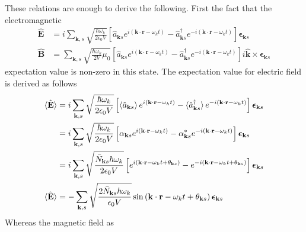 \documentclass[../../../main.tex]{subfiles}
\begin{document}
These relations are enough to derive the following.
First the fact that the electromagnetic
\begin{align*}
  \hat{\mathbf{E}} & =  i \sum_{\mathbf{k},s} \sqrt{\frac{\hbar \omega_k}{2 \epsilon_0 V}} \left[ \hat{a}_{\mathbf{k}s} e^{i(\mathbf{k} \cdot \mathbf{r} - \omega_k t)} - \hat{a}_{\mathbf{k}s}^{\dagger} e^{-i(\mathbf{k} \cdot \mathbf{r} - \omega_k t)} \right] \boldsymbol{\epsilon}_{\mathbf{k}s}                    \\
  \hat{\mathbf{B}} & =  \sum_{\mathbf{k},s} \sqrt{\frac{\hbar \omega_k}{2 V} \mu_0} \left[ \hat{a}_{\mathbf{k}s} e^{i(\mathbf{k} \cdot \mathbf{r} - \omega_k t)} - \hat{a}_{\mathbf{k}s}^{\dagger} e^{-i(\mathbf{k} \cdot \mathbf{r} - \omega_k t)} \right] i \mathbf{\hat{k}} \times \boldsymbol{\epsilon}_{\mathbf{k}s}
\end{align*}
expectation value is non-zero in this state.
The expectation value for electric field is derived as follows
\begin{align*}
  \braket{  \hat{\mathbf{E}}  }
   & =  i \sum_{\mathbf{k},s} \sqrt{\frac{\hbar \omega_k}{2 \epsilon_0 V}} \left[ \braket{\hat{a}_{\mathbf{k}s}  } e^{i(\mathbf{k} \cdot \mathbf{r} - \omega_k t)} - \braket{\hat{a}_{\mathbf{k}s}^{\dagger}} e^{-i(\mathbf{k} \cdot \mathbf{r} - \omega_k t)} \right] \boldsymbol{\epsilon}_{\mathbf{k}s} \\
   & =  i \sum_{\mathbf{k},s} \sqrt{\frac{\hbar \omega_k}{2 \epsilon_0 V}} \left[ \alpha_{\mathbf{k }s} e^{i(\mathbf{k} \cdot \mathbf{r} - \omega_k t)} - \alpha_{\mathbf{k }s}^* e^{-i(\mathbf{k} \cdot \mathbf{r} - \omega_k t)} \right] \boldsymbol{\epsilon}_{\mathbf{k}s}                             \\
   & =  i \sum_{\mathbf{k},s} \sqrt{\frac{\bar{N}_{\mathbf{k}s}\hbar \omega_k }{2 \epsilon_0 V}} \left[  e^{i(\mathbf{k} \cdot \mathbf{r} - \omega_k t+ \theta_{\mathbf{k}s})} - e^{-i(\mathbf{k} \cdot \mathbf{r} - \omega_k t+\theta_{\mathbf{k}s}) } \right] \boldsymbol{\epsilon}_{\mathbf{k}s}        \\
  \braket{  \hat{\mathbf{E}}  }
   & =  - \sum_{\mathbf{k},s} \sqrt{\frac{2\bar{N}_{\mathbf{k}s}\hbar \omega_k }{ \epsilon_0 V}}  \sin   \left( \mathbf{k} \cdot \mathbf{r} - \omega_k t+\theta_{\mathbf{k}s}  \right) \boldsymbol{\epsilon}_{\mathbf{k}s}
\end{align*}
Whereas the magnetic field as
\end{document}
